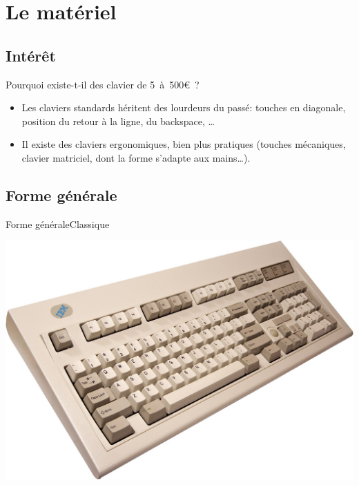 \section{Le matériel}

\subsection{Intérêt}
\begin{frame}{Pourquoi existe-t-il des clavier de 5~à~500€~?}
    \begin{itemize}
        \item Les claviers standards héritent des lourdeurs du passé: touches
        en diagonale, position  du retour à la ligne, du backspace, … \pause
        \item Il existe des claviers ergonomiques, bien plus pratiques (touches
        mécaniques, clavier matriciel, dont la forme s’adapte aux mains…).
    \end{itemize}
\end{frame}

\subsection{Forme générale}
\begin{frame}{Forme générale}{Classique}
	\begin{center}
		\includegraphics[scale=0.28]{images/hard_modelm}
	\end{center}
\end{frame}

